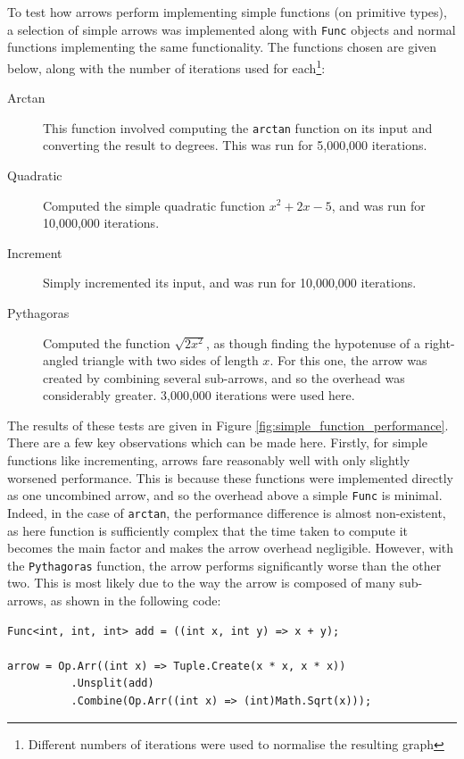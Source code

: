 \documentclass[12pt,twoside,notitlepage]{report}
\begin{document}
To test how arrows perform implementing simple functions (on primitive types), a selection of simple arrows was implemented along with \texttt{Func} objects and normal functions implementing the same functionality. The functions chosen are given below, along with the number of iterations used for each\footnote{Different numbers of iterations were used to normalise the resulting graph}:

\begin{description}
	\item[Arctan] This function involved computing the \texttt{arctan} function on its input and converting the result to degrees. This was run for 5,000,000 iterations.
	\item[Quadratic] Computed the simple quadratic function $x^2 + 2x - 5$, and was run for 10,000,000 iterations.
	\item[Increment] Simply incremented its input, and was run for 10,000,000 iterations.
	\item[Pythagoras] Computed the function $\sqrt{2 x^2}$, as though finding the hypotenuse of a right-angled triangle with two sides of length $x$. For this one, the arrow was created by combining several sub-arrows, and so the overhead was considerably greater. 3,000,000 iterations were used here.
\end{description}

The results of these tests are given in Figure \ref{fig:simple_function_performance}. There are a few key observations which can be made here. Firstly, for simple functions like incrementing, arrows fare reasonably well with only slightly worsened performance. This is because these functions were implemented directly as one uncombined arrow, and so the overhead above a simple \texttt{Func} is minimal. Indeed, in the case of \texttt{arctan}, the performance difference is almost non-existent, as here function is sufficiently complex that the time taken to compute it becomes the main factor and makes the arrow overhead negligible. However, with the \texttt{Pythagoras} function, the arrow performs significantly worse than the other two. This is most likely due to the way the arrow is composed of many sub-arrows, as shown in the following code:

\begin{lstlisting}[language={[sharp]C}]
Func<int, int, int> add = ((int x, int y) => x + y);

arrow = Op.Arr((int x) => Tuple.Create(x * x, x * x))
          .Unsplit(add)
          .Combine(Op.Arr((int x) => (int)Math.Sqrt(x)));
\end{lstlisting}
\end{document}
